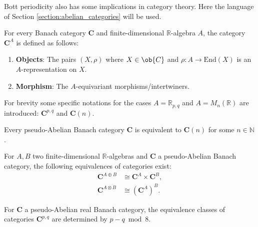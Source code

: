     Bott periodicity also has some implications in category theory. Here the language of Section \ref{section:abelian_categories} will be used.

    For every Banach category $\mathbf{C}$ and finite-dimensional $\mathbb{R}$-algebra $A$, the category $\mathbf{C}^A$ is defined as follows:
    \begin{enumerate}
        \item\textbf{Objects}: The pairs $(X,\rho)$ where $X\in\ob{C}$ and $\rho:A\rightarrow\text{End}(X)$ is an $A$-representation on $X$.
        \item\textbf{Morphism}: The $A$-equivariant morphisms/intertwiners.
    \end{enumerate}
    \begin{notation}
        For brevity some specific notations for the cases $A=\mathbb{R}_{p,q}$ and $A=M_n(\mathbb{R})$ are introduced: $\mathbf{C}^{p,q}$ and $\mathbf{C}(n)$.
    \end{notation}

    \begin{property}
        Every pseudo-Abelian Banach category $\mathbf{C}$ is equivalent to $\mathbf{C}(n)$ for some $n\in\mathbb{N}$.
    \end{property}

    \begin{property}
        For $A,B$ two finite-dimensional $\mathbb{R}$-algebras and $\mathbf{C}$ a pseudo-Abelian Banach category, the following equivalences of categories exist:
        \begin{align}
            \mathbf{C}^{A\oplus B}&\cong\mathbf{C}^A\times\mathbf{C}^B,\\
            \mathbf{C}^{A\otimes B}&\cong\left(\mathbf{C}^A\right)^B.
        \end{align}
    \end{property}
    \begin{property}\label{clifford:bott_periodicity_category}
        For $\mathbf{C}$ a pseudo-Abelian real Banach category, the equivalence classes of categories $\mathbf{C}^{p,q}$ are determined by $p-q\bmod8$.
    \end{property}

